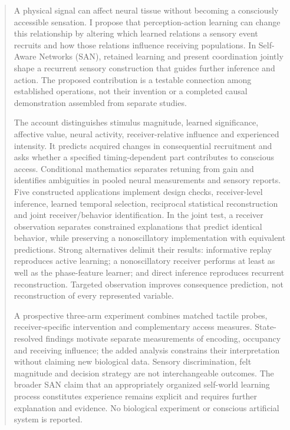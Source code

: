 \documentclass[
  american,
  11pt,
  letterpaper,
]{article}
\begin{document}
\begin{abstract}
A physical signal can affect neural tissue without becoming a consciously accessible sensation. I propose that perception-action learning can change this relationship by altering which learned relations a sensory event recruits and how those relations influence receiving populations. In Self-Aware Networks (SAN), retained learning and present coordination jointly shape a recurrent sensory construction that guides further inference and action. The proposed contribution is a testable connection among established operations, not their invention or a completed causal demonstration assembled from separate studies.

The account distinguishes stimulus magnitude, learned significance, affective value, neural activity, receiver-relative influence and experienced intensity. It predicts acquired changes in consequential recruitment and asks whether a specified timing-dependent part contributes to conscious access. Conditional mathematics separates retuning from gain and identifies ambiguities in pooled neural measurements and sensory reports. Five constructed applications implement design checks, receiver-level inference, learned temporal selection, reciprocal statistical reconstruction and joint receiver/behavior identification. In the joint test, a receiver observation separates constrained explanations that predict identical behavior, while preserving a nonoscillatory implementation with equivalent predictions. Strong alternatives delimit their results: informative replay reproduces active learning; a nonoscillatory receiver performs at least as well as the phase-feature learner; and direct inference reproduces recurrent reconstruction. Targeted observation improves consequence prediction, not reconstruction of every represented variable.

A prospective three-arm experiment combines matched tactile probes, receiver-specific intervention and complementary access measures. State-resolved findings motivate separate measurements of encoding, occupancy and receiving influence; the added analysis constrains their interpretation without claiming new biological data. Sensory discrimination, felt magnitude and decision strategy are not interchangeable outcomes. The broader SAN claim that an appropriately organized self-world learning process constitutes experience remains explicit and requires further explanation and evidence. No biological experiment or conscious artificial system is reported.
\end{abstract}
\end{document}
